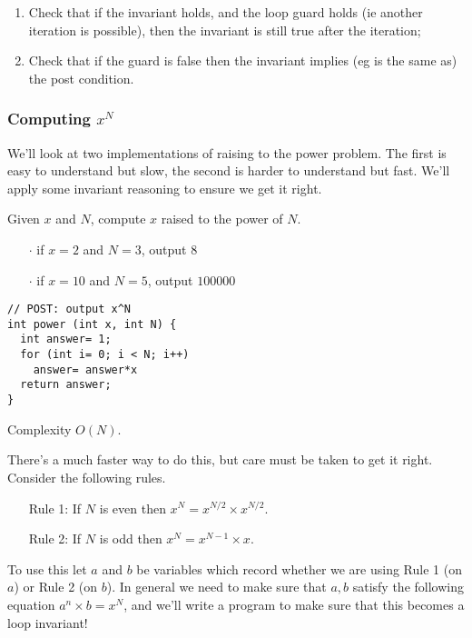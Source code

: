 \documentclass[twoside=false,DIV=14]{scrartcl}
\begin{document}
\begin{itemize}
\begin{enumerate}
\item Check that if the invariant holds, and the loop guard holds (ie another iteration is possible), then the invariant is still true after the iteration;

\item Check that if the guard is false then the invariant implies (eg is the same as) the post condition.
\end{enumerate}

\subsubsection*{Computing $x^N$}

We'll look at two implementations of raising to the power problem. The first is easy to understand but slow, the second is harder to understand but fast. We'll apply some invariant reasoning to ensure we get it right.

Given $x$ and $N$, compute $x$ raised to the power of $N$.

\begin{itemize}
  \item[$\cdot$] if $x = 2$ and $N= 3$, output $8$
   \item[$\cdot$]      if $x= 10$ and $N= 5$, output $100000$
\end{itemize}

\begin{verbatim}
// POST: output x^N
int power (int x, int N) {
  int answer= 1;
  for (int i= 0; i < N; i++)
    answer= answer*x
  return answer;
}
\end{verbatim}

Complexity $O(N)$.

There's a much faster way to do this, but care must be taken to get it right. Consider the following rules.

\begin{itemize}
  \item[Rule 1: ] If $N$ is even then $x^N = x^{N/2} \times x^{N/2}$.

   \item[Rule 2: ] If $N$ is odd then $x^N = x^{N-1} \times x$.
\end{itemize}

To use this let $a$ and $b$ be variables which record whether we are
using Rule 1 (on $a$) or Rule 2 (on $b$).   In general we need to make sure that $a, b$ satisfy the following equation $a^n \times b = x^N$, and we'll write a program to make sure that this becomes a loop invariant!


\end{itemize}
\end{document}

